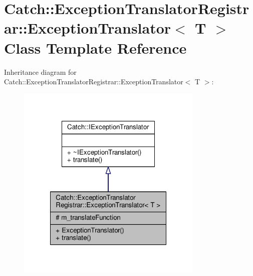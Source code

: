 \hypertarget{class_catch_1_1_exception_translator_registrar_1_1_exception_translator}{\section{Catch\-:\-:Exception\-Translator\-Registrar\-:\-:Exception\-Translator$<$ T $>$ Class Template Reference}
\label{class_catch_1_1_exception_translator_registrar_1_1_exception_translator}
}


Inheritance diagram for Catch\-:\-:Exception\-Translator\-Registrar\-:\-:Exception\-Translator$<$ T $>$\-:
\nopagebreak
\begin{figure}[H]
\begin{center}
\leavevmode
\includegraphics[width=252pt]{class_catch_1_1_exception_translator_registrar_1_1_exception_translator__inherit__graph}
\end{center}
\end{figure}


